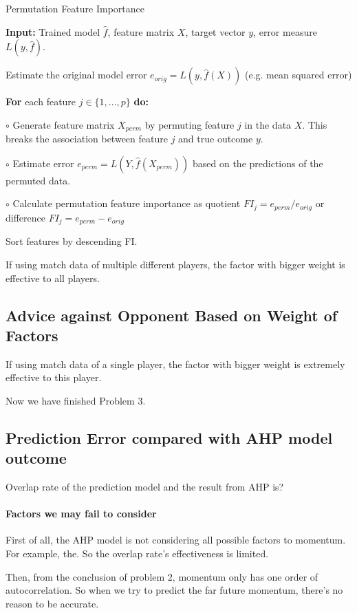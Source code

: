 \begin{algorithm}  
    \caption{Permutation Feature Importance}  
    \textbf{Input:} Trained model $\hat{f}$, feature matrix $X$, target vector $y$, error measure $L(y, \hat{f})$.  
      
    Estimate the original model error $e_{orig} = L(y, \hat{f}(X))$ (e.g. mean squared error)  
      
    \textbf{For} each feature $j \in \{1, ..., p\}$ \textbf{do:}  
      
    \quad\quad $\circ$ Generate feature matrix $X_{perm}$ by permuting feature $j$ in the data $X$. This breaks the association between feature $j$ and true outcome $y$.  
      
    \quad\quad $\circ$ Estimate error $e_{perm} = L(Y, \hat{f}(X_{perm}))$ based on the predictions of the permuted data.  
      
    \quad\quad $\circ$ Calculate permutation feature importance as quotient $FI_j = e_{perm} / e_{orig}$ or difference $FI_j = e_{perm} - e_{orig}$  
      
    Sort features by descending FI.
\end{algorithm}

If using match data of multiple different players, the factor with bigger weight is effective to 
all players.

\subsection{Advice against Opponent Based on Weight of Factors}

If using match data of a single player, the factor with bigger weight is extremely effective to 
this player.

Now we have finished Problem 3.

\subsection{Prediction Error compared with AHP model outcome}

Overlap rate of the prediction model and the result from AHP is?

\paragraph{Factors we may fail to consider}

First of all, the AHP model is not considering all possible factors to momentum.
For example, the.
So the overlap rate's effectiveness is limited.

Then, from the conclusion of problem 2, momentum only has one order of autocorrelation.
So when we try to predict the far future momentum, there's no reason to be accurate.